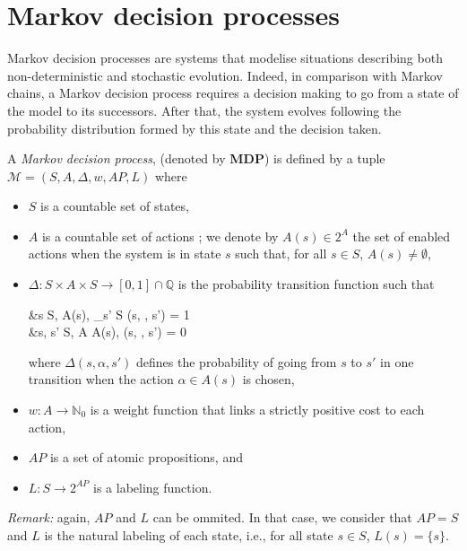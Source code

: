 \section{Markov decision processes}
Markov decision processes are systems that modelise situations describing both non-deterministic and stochastic evolution. Indeed, in comparison with Markov chains, a Markov decision process requires a decision making to go from a state of the model to its successors. After that, the system evolves following the probability distribution formed by this state and the decision taken.

\begin{definition}
	A \textit{Markov decision process}, (denoted by \textbf{MDP}) is defined by a tuple $\mathcal{M}  = (S, A, \Delta, w, AP, L)$ where
	\begin{itemize}
		\item $S$ is a countable set of states,
		\item $A$ is a countable set of actions ; we denote by $A(s) \in 2^A$  the set of enabled actions when the system is in state $s$ such that, for all $s \in S$,
    $A(s) \neq \emptyset$,
		\item $\Delta: S \times A \times S \rightarrow [0, 1] \cap \mathbb{Q}$ is the probability transition function such that
		\begin{flalign*}
			&\forall s \in S, \; \forall \alpha \in A(s), \; \sum_{s' \in S} \Delta(s, \alpha, s') = 1 \\
			 &\forall s, s' \in S, \; \forall \alpha \in A \setminus A(s), \; \Delta(s, \alpha, s') = 0
		\end{flalign*}

			where $\Delta(s, \alpha, s')$ defines the probability of going from $s$ to $s'$ in one transition when the action $\alpha \in A(s)$ is chosen,
    \item $w: A \rightarrow \mathbb{N}_0$ %
      is a weight function that links a strictly positive cost to each action,
    \item $AP$ is a set of atomic propositions, and
    \item $L: S \rightarrow 2^{AP}$ is a labeling function.
	\end{itemize}
  \textit{Remark: }again, $AP$ and $L$ can be ommited. In that case, we consider that $AP=S$ and $L$ is the natural labeling of each state, i.e., for all state $s \in S$, $L(s) = \{s\}$.
\end{definition}

